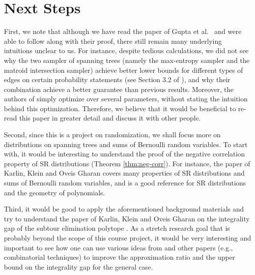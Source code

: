 \documentclass[letterpaper, reqno,12pt]{article}
\begin{document}
\section{Next Steps}

First, we note that although we have read the paper of Gupta et al.\ \cite{gupta2021matroid} and were able to follow along with their proof, there still remain many underlying intuitions unclear to us. For instance, despite tedious calculations, we did not see why the two sampler of spanning trees (namely the max-entropy sampler and the matroid intersection sampler) achieve better lower bounds for different types of edges on certain probability statements (see Section 3.2 of \cite{gupta2021matroid}), and why their combination achieve a better guarantee than previous results. Moreover, the authors of \cite{gupta2021matroid} simply optimize over several parameters, without stating the intuition behind this optimization. Therefore, we believe that it would be beneficial to re-read this paper in greater detail and discuss it with other people.

Second, since this is a project on randomization, we shall focus more on distributions on spanning trees and sums of Bernoulli random variables. To start with, it would be interesting to understand the proof of the negative correlation property of SR distributions (Theorem \ref{thm:neg-corr}). For instance, the paper of Karlin, Klein and Oveis Gharan \cite{karlin2021slightly} covers many properties of SR distributions and sums of Bernoulli random variables, and \cite{borcea2009negative} is a good reference for SR distributions and the geometry of polynomials.

Third, it would be good to apply the aforementioned background materials and try to understand the paper of Karlin, Klein and Oveis Gharan on the integrality gap of the subtour elimination polytope \cite{karlin2021slightlyig}. As a stretch research goal that is probably beyond the scope of this course project, it would be very interesting and important to see how one can use various ideas from \cite{gupta2021matroid} and other papers (e.g., combinatorial techniques) to improve the approximation ratio and the upper bound on the integrality gap for the general case.



\end{document}
